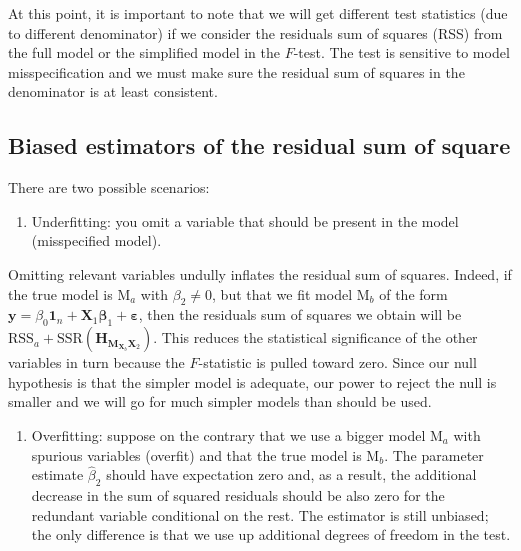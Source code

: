 \documentclass[]{book}
\providecommand{\tightlist}{%
  \setlength{\itemsep}{0pt}\setlength{\parskip}{0pt}}
\theoremstyle{definition}
\theoremstyle{definition}
\theoremstyle{definition}
\theoremstyle{remark}
\begin{document}
At this point, it is important to note that we will get different test
statistics (due to different denominator) if we consider the residuals
sum of squares (RSS) from the full model or the simplified model in the
\(F\)-test. The test is sensitive to model misspecification and we must
make sure the residual sum of squares in the denominator is at least
consistent.

\hypertarget{biased-rss}{%
\subsection{Biased estimators of the residual sum of
square}\label{biased-rss}}

There are two possible scenarios:

\begin{enumerate}
\def\labelenumi{\arabic{enumi}.}
\tightlist
\item
  Underfitting: you omit a variable that should be present in the model
  (misspecified model).
\end{enumerate}

Omitting relevant variables undully inflates the residual sum of
squares. Indeed, if the true model is \(\mathrm{M}_a\) with
\(\beta_2 \neq 0\), but that we fit model \(\mathrm{M}_b\) of the form
\(\boldsymbol{y} = \beta_0\mathbf{1}_n + \mathbf{X}_1\boldsymbol{\beta}_1 + \boldsymbol{\varepsilon}\),
then the residuals sum of squares we obtain will be
\(\mathrm{RSS}_{a} + \mathrm{SSR}( \mathbf{H}_{\mathbf{M}_{\mathbf{X}_b}\mathbf{X}_2})\).
This reduces the statistical significance of the other variables in turn
because the \(F\)-statistic is pulled toward zero. Since our null
hypothesis is that the simpler model is adequate, our power to reject
the null is smaller and we will go for much simpler models than should
be used.

\begin{enumerate}
\def\labelenumi{\arabic{enumi}.}
\setcounter{enumi}{1}
\tightlist
\item
  Overfitting: suppose on the contrary that we use a bigger model
  \(\mathrm{M}_a\) with spurious variables (overfit) and that the true
  model is \(\mathrm{M}_b\). The parameter estimate \(\hat{\beta}_2\)
  should have expectation zero and, as a result, the additional decrease
  in the sum of squared residuals should be also zero for the redundant
  variable conditional on the rest. The estimator is still unbiased; the
  only difference is that we use up additional degrees of freedom in the
  test.
\end{enumerate}
\end{document}
